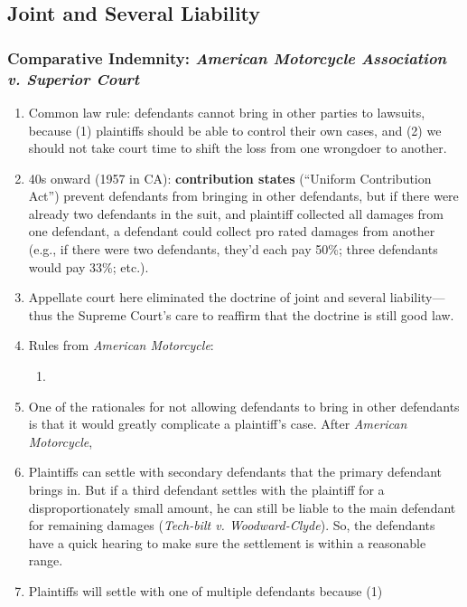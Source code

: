 \subsection{Joint and Several Liability}

\subsubsection{Comparative Indemnity: \emph{American Motorcycle Association v. 
Superior Court}}

\begin{enumerate}
    \item Common law rule: defendants cannot bring in other parties to 
    lawsuits, because (1) plaintiffs should be able to control their own 
    cases, and (2) we should not take court time to shift the loss from one 
    wrongdoer to another.
    \item 40s onward (1957 in CA): \textbf{contribution states} (``Uniform 
    Contribution Act'') prevent defendants from bringing in other defendants, 
    but if there were already two defendants in the suit, and plaintiff 
    collected all damages from one defendant, a defendant could collect pro 
    rated damages from another (e.g., if there were two defendants, they'd 
    each pay 50\%; three defendants would pay 33\%; etc.).
    \item Appellate court here eliminated the doctrine of joint and several 
    liability---thus the Supreme Court's care to reaffirm that the doctrine is 
    still good law.
    \item Rules from \emph{American Motorcycle}:
    \begin{enumerate}
        \item %
    \end{enumerate}
    \item One of the rationales for not allowing defendants to bring in other 
    defendants is that it would greatly complicate a plaintiff's case. After 
    \emph{American Motorcycle}, \item Plaintiffs can settle with secondary 
    defendants that the primary defendant brings in. But if a third defendant 
    settles with the plaintiff for a disproportionately small amount, he can 
    still be liable to the main defendant for remaining damages 
    (\emph{Tech-bilt v. Woodward-Clyde}). So, the defendants have a quick 
    hearing to make sure the settlement is within a reasonable range.
    \item Plaintiffs will settle with one of multiple defendants because (1) 

\end{enumerate}
